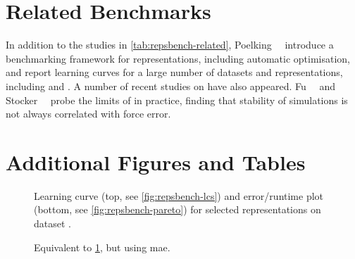 \section{Related Benchmarks}
\label{sec:si-repsbench_literature}

In addition to the studies in \cref{tab:repsbench-related}, Poelking~\etal{}~\cite{pfc2022q} introduce a benchmarking framework for representations, including automatic \hp optimisation, and report learning curves for a large number of datasets and representations, including \dsgdb and \dsba.
A number of recent studies on \mlps have also appeared. Fu~\etal~\cite{fwgj2022a} and Stocker~\etal~\cite{sggm2022q} probe the limits of \mlps in practice, finding that stability of simulations is not always correlated with force error.


\section{Additional Figures and Tables}

\begin{figure}
  \centering


  \caption{Learning curve (top, see \cref{fig:repsbench-lcs}) and error/runtime plot (bottom, see \cref{fig:repsbench-pareto}) for selected representations on dataset \dstcou.
  }
  \label{fig:repsbench-nmd18}
\end{figure}

\clearpage
\begin{figure}
  \centering


  \caption{
  Equivalent to \cref{fig:repsbench-nmd18}, but using \gls{mae}.
  }
  \label{fig:si-repsbench_nmd18_mae}
\end{figure}
\vspace*{\fill}

